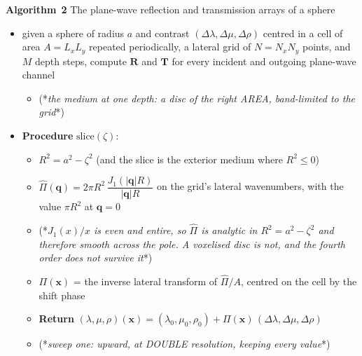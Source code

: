\documentclass[11pt,a4paper]{article}
\newcommand{\bT}{\mathbf{T}}
\newcommand{\bR}{\mathbf{R}}
\begin{document}
\vspace{3mm}
\noindent\begin{minipage}{\linewidth}
\textbf{Algorithm}~\textbf{2} {\sc The plane-wave reflection and transmission
arrays of a sphere}\newline
\vspace{2mm}

\begin{itemize}
\item given a sphere of radius $a$ and contrast $(\Delta\lambda,\Delta\mu,
\Delta\rho)$ centred in a cell of area $A=L_xL_y$ repeated periodically, a
lateral grid of $N=N_xN_y$ points, and $M$ depth steps, compute $\bR$ and $\bT$
for every incident and outgoing plane-wave channel

\begin{itemize}
\item (*{\em the medium at one depth: a disc of the right AREA, band-limited to
the grid\/}*)
\end{itemize}

\item \textbf{Procedure} $\mathrm{slice}(\zeta)$:
\begin{itemize}
\item $R^{2} = a^{2}-\zeta^{2}$ \quad (and the slice is the exterior medium
      where $R^{2}\le0$)
\item $\widehat{\Pi}(\mathbf{q}) = 2\pi R^{2}\,
      \dfrac{J_1(|\mathbf{q}|R)}{|\mathbf{q}|R}$ \quad on the grid's lateral
      wavenumbers, with the value $\pi R^{2}$ at $\mathbf{q}=0$
\item (*{\em $J_1(x)/x$ is even and entire, so $\widehat{\Pi}$ is analytic in
      $R^{2}=a^{2}-\zeta^{2}$ and therefore smooth across the pole.  A voxelised
      disc is not, and the fourth order does not survive it\/}*)
\item $\Pi(\mathbf{x})$ = the inverse lateral transform of $\widehat{\Pi}/A$, centred on the
      cell by the shift phase
\item \textbf{Return} $(\lambda,\mu,\rho)(\mathbf{x}) =
      (\lambda_0,\mu_0,\rho_0) + \Pi(\mathbf{x})\,
      (\Delta\lambda,\Delta\mu,\Delta\rho)$
\end{itemize}

\begin{itemize}
\item (*{\em sweep one: upward, at DOUBLE resolution, keeping every value\/}*)
\end{itemize}


\end{itemize}
\end{minipage}
\end{document}
